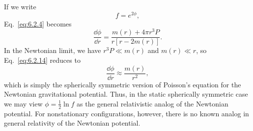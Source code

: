 If we write
\begin{equation}
  f=e^{2\phi},
  \tag{6.2.13}\label{eq:6.2.13}
\end{equation}
Eq.~\eqref{eq:6.2.4} becomes
\begin{equation}
  \frac{\dd\phi}{\dd r}=\frac{m(r)+4\pi r^3P}{r[r-2m(r)]}.
  \tag{6.2.14}\label{eq:6.2.14}
\end{equation}
In the Newtonian limit, we have \(r^3P\ll m(r)\) and \(m(r)\ll r\), so
Eq.~\eqref{eq:6.2.14} reduces to
\begin{equation}
  \frac{\dd\phi}{\dd r}\approx\frac{m(r)}{r^2},
  \tag{6.2.15}\label{eq:6.2.15}
\end{equation}
which is simply the spherically symmetric version of Poisson's equation for the
Newtonian gravitational potential. Thus, in the static spherically symmetric case
we may view \(\phi=\tfrac12\ln f\) as the general relativistic analog of the
Newtonian potential. For nonstationary configurations, however, there is no known
analog in general relativity of the Newtonian potential.

